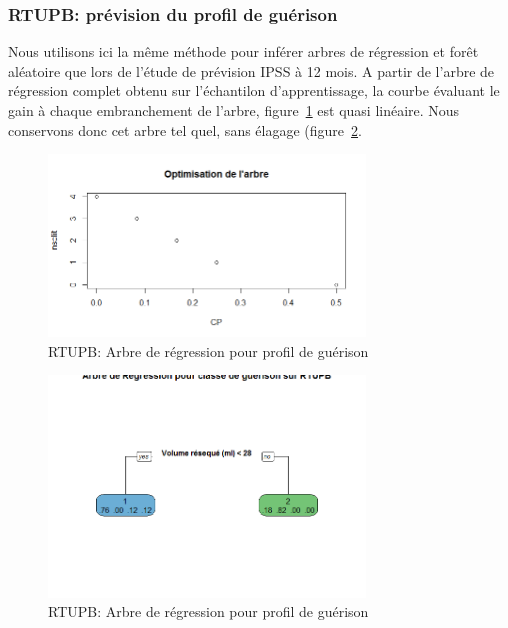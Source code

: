 %
%

%

\subsubsection{RTUPB: prévision du profil de guérison}

Nous utilisons ici la même méthode pour inférer arbres de régression et forêt aléatoire que lors de l'étude de prévision IPSS à 12 mois. A partir de l'arbre de régression complet obtenu sur l'échantilon d'apprentissage, la courbe évaluant le gain à chaque embranchement de l'arbre, figure~\ref{fig-rtupb-regtree-optim-healing-class} est quasi linéaire. Nous conservons donc cet arbre tel quel, sans élagage (figure~\ref{fig-rtupb-regtree-healing-class}.

\begin{figure}[H]
\centering
\includegraphics[width=0.75\textwidth]{../Fig/RTUPB/rtupb-regtree-optim-healing-class.png}
\caption{RTUPB: Arbre de régression pour profil de guérison}
\label{fig-rtupb-regtree-optim-healing-class}
\end{figure}

\begin{figure}[H]
\centering
\includegraphics[width=0.75\textwidth]{../Fig/RTUPB/rtupb-regtree-healing-class.png}
\caption{RTUPB: Arbre de régression pour profil de guérison}
\label{fig-rtupb-regtree-healing-class}
\end{figure}

